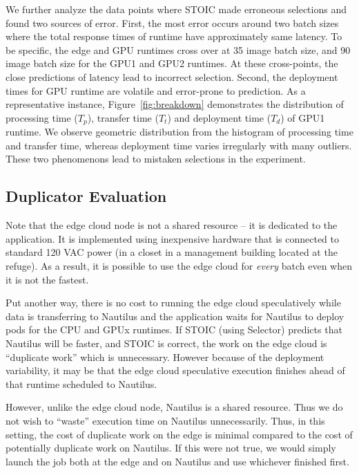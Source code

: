 We further analyze the data points where STOIC made erroneous selections and
found two sources of error. First, the most error occurs around two batch
sizes where the total response times of runtime have approximately same
latency. To be specific, the edge and GPU runtimes cross over at 35 image
batch size, and 90 image batch size for the GPU1 and GPU2 runtimes. At these
cross-points, the close predictions of latency lead to incorrect selection.
Second, the deployment times for GPU runtime are volatile and error-prone to
prediction. As a representative instance, Figure~\ref{fig:breakdown}
demonstrates the distribution of processing time ($T_p$), transfer time
($T_t$) and deployment time ($T_d$) of GPU1 runtime. We observe geometric
distribution from the histogram of processing time and transfer time, whereas
deployment time varies irregularly with many outliers. These two phenomenons
lead to mistaken selections in the experiment.

\subsection{Duplicator Evaluation}

Note that the edge cloud node is not a shared resource -- it is dedicated to
the application. It is implemented using inexpensive hardware that is
connected to standard 120 VAC power (in a closet in a management building
located at the refuge).
As a result,
it is possible to use the edge cloud for \textit{every} batch even when it is
not the fastest.  

Put another way, there is no cost to running the edge cloud speculatively
while data is transferring to Nautilus and the application waits for Nautilus
to deploy pods for the CPU and GPUx runtimes. If STOIC (using Selector)
predicts that Nautilus will be faster, and STOIC is correct, the work on the
edge cloud is ``duplicate work'' which is unnecessary. However because of the
deployment variability, it may be that the edge cloud speculative execution
finishes ahead of that runtime scheduled to Nautilus.

However, unlike the edge cloud node, Nautilus is a shared resource.  Thus we
do not wish to ``waste'' execution time on Nautilus unnecessarily. Thus, in
this setting, the cost of duplicate work on the edge is minimal compared to
the cost of potentially duplicate work on Nautilus. If this were not true, we
would simply launch the job both at the edge and on Nautilus and use whichever
finished first.

